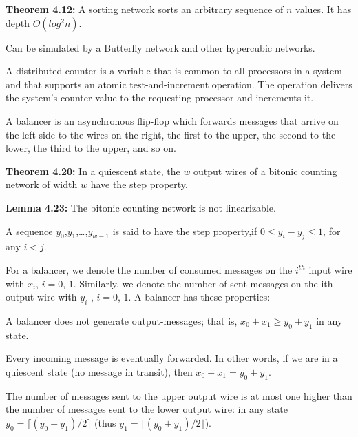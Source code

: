{
	\begin{items}
		\item {\bf Theorem 4.12:} A sorting network sorts an arbitrary sequence of
		$n$ values. It has depth $O(log^{2} n)$.
		\item Can be simulated by a Butterfly network and other hypercubic networks.
	\end{items}	
}

{
	A distributed counter is a variable that is common to all processors in a
	system and that supports an atomic test-and-increment operation. The
	operation delivers the system’s counter value to the requesting processor and
	increments it.
}

{
	A balancer is an asynchronous flip-flop which forwards messages that arrive on
	the left side to the wires on the right, the first to the upper, the second to
	the lower, the third to the upper, and so on.
}

{
	\begin{items}
		\item {\bf Theorem 4.20:} In a quiescent state, the $w$ output wires of a
		bitonic counting network of width $w$ have the step property.
		\item {\bf Lemma 4.23:} The bitonic counting network is not linearizable.
	\end{items}
}

{
	A sequence $y_0$,$y_1$,\ldots,$y_{w-1}$ is said to have the step property,if $0
	\leq y_i-y_j \leq 1$, for any $i<j$.
}

{
	For a balancer, we denote the number of consumed messages on the $i^{th}$ input
	wire with $x_i$, $i = 0$, $1$. Similarly, we denote the number of sent messages
	on the ith output wire with $y_i$ , $i = 0$, $1$. A balancer has these
	properties:
	\begin{enum}
		\item A balancer does not generate output-messages; that is, $x_0 + x_1 \geq
		y_0 + y_1$ in any state.
		\item Every incoming message is eventually forwarded. In other words, if we
		are in a quiescent state (no message in transit), then $x_0 + x_1 = y_0 +
		y_1$.
		\item The number of messages sent to the upper output wire is at most one
		higher than the number of messages sent to the lower output wire: in any
		state $y_0 = \lceil (y_0 + y_1)/2\rceil$ (thus $y_1 = \lfloor (y_0 +
		y_1)/2\rfloor$).
	\end{enum}
}

